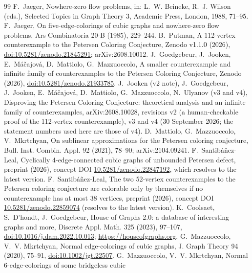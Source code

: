 \documentclass[11pt]{article}
\theoremstyle{definition}
\theoremstyle{remark}
\begin{document}
\begin{thebibliography}{99}
 F.~Jaeger, Nowhere-zero flow problems, in: L.~W. Beineke, R.~J. Wilson
(eds.), Selected Topics in Graph Theory 3, Academic Press, London, 1988, 71--95.
 F.~Jaeger, On five-edge-colorings of cubic graphs and nowhere-zero flow
problems, Ars Combinatoria 20-B (1985), 229--244.
 B.~Putman, A 112-vertex counterexample to the Petersen Coloring Conjecture,
Zenodo v1.1.0 (2026), \href{https://doi.org/10.5281/zenodo.21845291}{doi:10.5281/zenodo.21845291};
arXiv:2608.10012.
 J.~Goedgebeur, J.~Jooken, E.~M\'a\v{c}ajov\'a, D.~Mattiolo, G.~Mazzuoccolo,
A smaller counterexample and infinite family of counterexamples to the Petersen Coloring
Conjecture, Zenodo (2026), \href{https://doi.org/10.5281/zenodo.21933785}{doi:10.5281/zenodo.21933785}.
 J.~Jooken (v2 note), J.~Goedgebeur, J.~Jooken, E.~M\'a\v{c}ajov\'a,
D.~Mattiolo, G.~Mazzuoccolo, N.~Ulyanov (v3 and v4), Disproving the Petersen Coloring Conjecture:
theoretical analysis and an infinite family of counterexamples, arXiv:2608.10028, revisions v2 (a
human-checkable proof of the 112-vertex counterexample), v3 and v4 (30 September 2026; the statement
numbers used here are those of v4).
 D.~Mattiolo, G.~Mazzuoccolo, V.~Mkrtchyan, On sublinear approximations for the
Petersen coloring conjecture, Bull. Inst. Combin. Appl. 92 (2021), 78--90; arXiv:2104.09241.
 F.~Santib\'a\~nez-Leal, Cyclically 4-edge-connected cubic graphs of unbounded
Petersen defect, preprint (2026), concept DOI
\href{https://doi.org/10.5281/zenodo.22847192}{10.5281/zenodo.22847192}, which resolves to the latest version.
 F.~Santib\'a\~nez-Leal, The two 52-vertex counterexamples to the Petersen coloring
conjecture are colorable only by themselves if no counterexample has at most 38 vertices, preprint
(2026), concept DOI
\href{https://doi.org/10.5281/zenodo.22859074}{10.5281/zenodo.22859074} (resolves to the latest
version).
 K.~Coolsaet, S.~D'hondt, J.~Goedgebeur, House of Graphs 2.0: a database of
interesting graphs and more, Discrete Appl. Math. 325 (2023), 97--107,
\href{https://doi.org/10.1016/j.dam.2022.10.013}{doi:10.1016/j.dam.2022.10.013};
\url{https://houseofgraphs.org}.
 G.~Mazzuoccolo, V.~V. Mkrtchyan, Normal edge-colorings of cubic graphs,
J. Graph Theory 94 (2020), 75--91, \href{https://doi.org/10.1002/jgt.22507}{doi:10.1002/jgt.22507}.
 G.~Mazzuoccolo, V.~V. Mkrtchyan, Normal 6-edge-colorings of some bridgeless cubic

\end{thebibliography}
\end{document}
